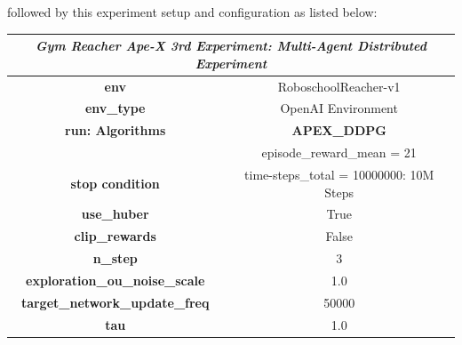 followed by this experiment setup and configuration as listed below:
\begin{table}[!htb]
    \centering
    \begin{tabular}{|c|l|l|c|l|l|}
    \hline
    \multicolumn{6}{|c|}{\textit{\textbf{Gym Reacher Ape-X 3rd Experiment: Multi-Agent Distributed Experiment}}}                                                        \\ \hline
    \multicolumn{3}{|c|}{\textbf{env}}                                  & \multicolumn{3}{c|}{RoboschoolReacher-v1}                                           \\ \hline
    \multicolumn{3}{|c|}{\textbf{env\_type}}                            & \multicolumn{3}{c|}{OpenAI Environment}                                             \\ \hline
    \multicolumn{3}{|c|}{\textbf{run: Algorithms}}                      & \multicolumn{3}{c|}{\cellcolor[HTML]{C0C0C0}\textbf{APEX\_DDPG}}                           \\ \hline
    \multicolumn{3}{|c|}{}                                              & \multicolumn{3}{c|}{\cellcolor[HTML]{E1F7E1}episode\_reward\_mean = 21}             \\ \cline{4-6} 
    \multicolumn{3}{|c|}{\multirow{-2}{*}{\textbf{stop condition}}}     & \multicolumn{3}{c|}{\cellcolor[HTML]{E1F7E1}time-steps\_total = 10000000: 10M Steps} \\ \hline
    \multicolumn{3}{|c|}{\textbf{use\_huber}}                                & \multicolumn{3}{c|}{True}                                                           \\ \hline
    \multicolumn{3}{|c|}{\textbf{clip\_rewards}}                            & \multicolumn{3}{c|}{False}                                                            \\ \hline
    \multicolumn{3}{|c|}{\textbf{n\_step}}                       & \multicolumn{3}{c|}{3}                                                             \\ \hline
    \multicolumn{3}{|c|}{\textbf{exploration\_ou\_noise\_scale}}                                   & \multicolumn{3}{c|}{1.0}                                                         \\ \hline
    \multicolumn{3}{|c|}{\textbf{target\_network\_update\_freq}}                 & \multicolumn{3}{c|}{50000}                                                           \\ \hline
    \multicolumn{3}{|c|}{\textbf{tau}}                   & \multicolumn{3}{c|}{1.0}                                                          \\ \hline

\end{tabular}
\end{table}
